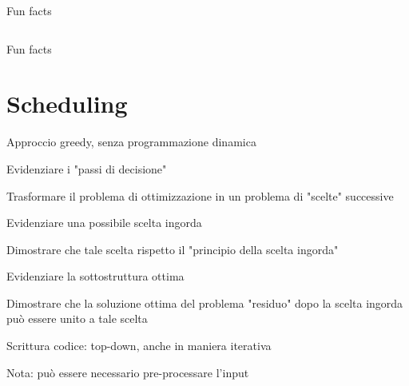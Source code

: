 \begin{OnlySlides}{Fun facts}

\vspace{-18pt}
\begin{columns}[T]
\vspace{-3pt}
\begin{center}
\vspace{-3pt}
\end{center}
\end{columns}    
\smallskip
{}
\begin{center}
\end{center}

\end{OnlySlides}

\begin{OnlySlides}{Fun facts}
\vspace{-12pt}
\end{OnlySlides}


\section{Scheduling}

\begin{frame}{Approccio greedy, senza programmazione dinamica}


\BIL
\item \alert{Evidenziare i "passi di decisione"}
\BI
\item Trasformare il problema di ottimizzazione in un problema di "scelte" successive
\EI

\item \alert{Evidenziare una possibile scelta ingorda}
\BI
\item Dimostrare che tale scelta rispetto il "principio della scelta ingorda"
\EI

\item \alert{Evidenziare la sottostruttura ottima}
\BI
\item Dimostrare che la soluzione ottima del problema "residuo" dopo la scelta ingorda può essere unito a tale scelta
\EI

\item \alert{Scrittura codice: top-down, anche in maniera iterativa}
\BI
\item Nota: può essere necessario pre-processare l'input
\EI
\EIL
\end{frame}



